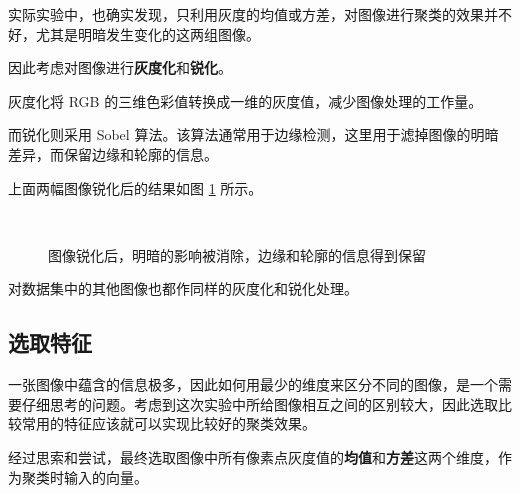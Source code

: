 \documentclass[a4paper, 12pt]{article}
\begin{document}
实际实验中，也确实发现，只利用灰度的均值或方差，对图像进行聚类的效果并不好，尤其是明暗发生变化的这两组图像。

因此考虑对图像进行\textbf{灰度化}和\textbf{锐化}。

灰度化将 RGB 的三维色彩值转换成一维的灰度值，减少图像处理的工作量。

而锐化则采用 Sobel 算法。该算法通常用于边缘检测，这里用于滤掉图像的明暗差异，而保留边缘和轮廓的信息。

上面两幅图像锐化后的结果如图 \ref{fig:sobel} 所示。

\begin{figure}[htbp]
    \centering
    \phantom{123}
    \\
    \caption{图像锐化后，明暗的影响被消除，边缘和轮廓的信息得到保留}
    \label{fig:sobel}
\end{figure}

对数据集中的其他图像也都作同样的灰度化和锐化处理。

\subsection{选取特征}
一张图像中蕴含的信息极多，因此如何用最少的维度来区分不同的图像，是一个需要仔细思考的问题。考虑到这次实验中所给图像相互之间的区别较大，因此选取比较常用的特征应该就可以实现比较好的聚类效果。

经过思索和尝试，最终选取图像中所有像素点灰度值的\textbf{均值}和\textbf{方差}这两个维度，作为聚类时输入的向量。
\end{document}
